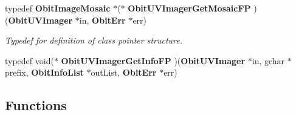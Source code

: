 \begin{CompactItemize}
typedef {\bf Obit\-Image\-Mosaic} $\ast$($\ast$ {\bf Obit\-UVImager\-Get\-Mosaic\-FP} )({\bf Obit\-UVImager} $\ast$in, {\bf Obit\-Err} $\ast$err)
\begin{CompactList}\small\item\em Typedef for definition of class pointer structure. \item\end{CompactList}\item 
typedef void($\ast$ {\bf Obit\-UVImager\-Get\-Info\-FP} )({\bf Obit\-UVImager} $\ast$in, gchar $\ast$prefix, {\bf Obit\-Info\-List} $\ast$out\-List, {\bf Obit\-Err} $\ast$err)
\end{CompactItemize}
\subsection*{Functions}
